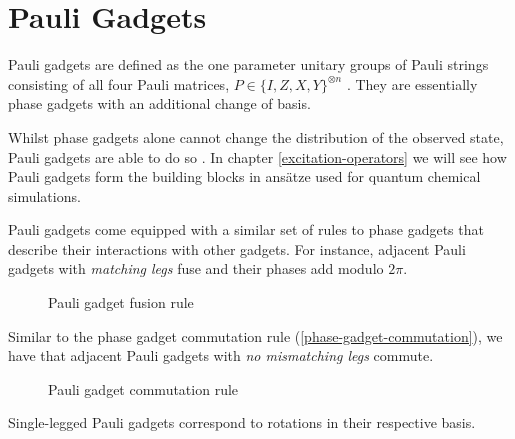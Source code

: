 \section{Pauli Gadgets}

Pauli gadgets are defined as the one parameter unitary groups of Pauli strings consisting of all four Pauli matrices, $P \in \{I, Z, X, Y\}^{\otimes n}$ \cite{Yeung2020}. They are essentially phase gadgets with an additional change of basis.


Whilst phase gadgets alone cannot change the distribution of the observed state, Pauli gadgets are able to do so \cite{Yeung2020}. In chapter \ref{excitation-operators} we will see how Pauli gadgets form the building blocks in ansätze used for quantum chemical simulations.

Pauli gadgets come equipped with a similar set of rules to phase gadgets that describe their interactions with other gadgets. For instance, adjacent Pauli gadgets with \textit{matching legs} fuse and their phases add modulo $2\pi$.

\begin{figure}[H]
    \centering
    \caption{Pauli gadget fusion rule}
    \label{pauli-gadget-fusion}
\end{figure}

Similar to the phase gadget commutation rule (\ref{phase-gadget-commutation}), we have that adjacent Pauli gadgets with \textit{no mismatching legs} commute.

\begin{figure}[H]
    \centering
    \caption{Pauli gadget commutation rule}
    \label{pauli-gadget-commutation}
\end{figure}

Single-legged Pauli gadgets correspond to rotations in their respective basis.

\vspace{5pt}

